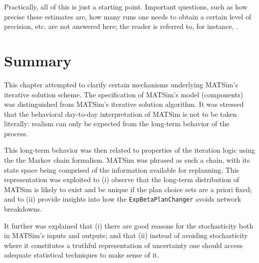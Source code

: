 Practically, all of this is just a starting point. Important questions,
such as how precise these estimates are, how many runs one needs to
obtain a certain level of precision, etc. are not answered here; the
reader is referred to, for instance, \citet{ross-2006}. 


\section{\label{sec:Summary}Summary}

This chapter attempted to clarify certain mechanisms underlying MATSim's
iterative solution scheme. The specification of MATSim's model (components)
was distinguished from MATSim's iterative solution algorithm. It was
stressed that the behavioral day-to-day interpretation of MATSim is
not to be taken literally: realism can only be expected from the long-term
behavior of the process.

This long-term behavior was then related to properties of the iteration
logic using the the Markov chain formalism. MATSim was phrased as
such a chain, with its state space being comprised of the information
available for replanning. This representation was exploited to (i)
observe that the long-term distribution of MATSim is likely to exist
and be unique if the plan choice sets are a priori fixed; and to (ii)
provide insights into how the \texttt{ExpBetaPlanChanger} avoids network
breakdowns. 

It further was explained that (i) there are good reasons for the stochasticity
both in MATSim's inputs and outputs; and that (ii) instead of avoiding
stochasticity where it constitutes a truthful representation of uncertainty
one should access adequate statistical techniques to make sense of
it. 


